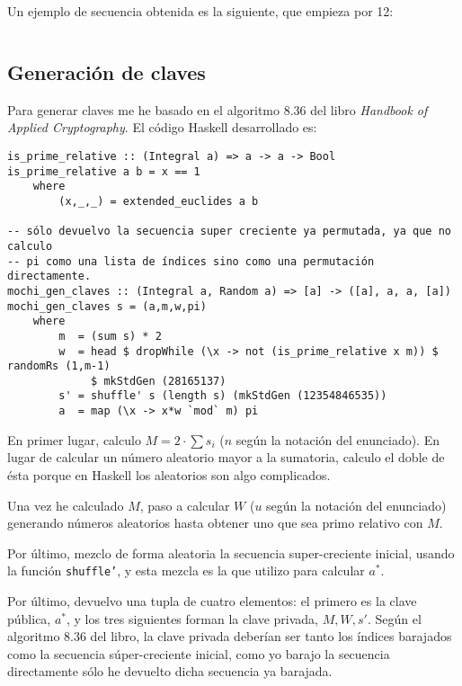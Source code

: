 \documentclass[10pt,spanish]{article}
\begin{document}
Un ejemplo de secuencia obtenida es la siguiente, que empieza por 12:

\begin{displaymath}
    [12,24,48,96,192,384,768,1536,3072,6144]
\end{displaymath}

\subsection{\textcolor{azul}Generación de claves}
Para generar claves me he basado en el algoritmo 8.36 del libro \textit{\textcolor{azul}{Handbook of Applied Cryptography}}. El código Haskell desarrollado es:

\begin{verbatim}
is_prime_relative :: (Integral a) => a -> a -> Bool
is_prime_relative a b = x == 1
    where
        (x,_,_) = extended_euclides a b

-- sólo devuelvo la secuencia super creciente ya permutada, ya que no calculo
-- pi como una lista de índices sino como una permutación directamente.
mochi_gen_claves :: (Integral a, Random a) => [a] -> ([a], a, a, [a])
mochi_gen_claves s = (a,m,w,pi)
    where
        m  = (sum s) * 2
        w  = head $ dropWhile (\x -> not (is_prime_relative x m)) $ randomRs (1,m-1) 
             $ mkStdGen (28165137)
        s' = shuffle' s (length s) (mkStdGen (12354846535))
        a  = map (\x -> x*w `mod` m) pi
\end{verbatim}

En primer lugar, calculo $M = 2 \cdot \sum s_i$ ($n$ según la notación del enunciado). En lugar de calcular un número aleatorio mayor a la sumatoria, calculo el doble de ésta porque en Haskell los aleatorios son algo complicados. 

Una vez he calculado $M$, paso a calcular $W$ ($u$ según la notación del enunciado) generando números aleatorios hasta obtener uno que sea primo relativo con $M$.

Por último, mezclo de forma aleatoria la secuencia super-creciente inicial, usando la función \texttt{shuffle'}, y esta mezcla es la que utilizo para calcular $a^*$.

Por último, devuelvo una tupla de cuatro elementos: el primero es la clave pública, $a^*$, y los tres siguientes forman la clave privada, $M, W, s'$. Según el algoritmo 8.36 del libro, la clave privada deberían ser tanto los índices barajados como la secuencia súper-creciente inicial, como yo barajo la secuencia directamente sólo he devuelto dicha secuencia ya barajada.
\end{document}
